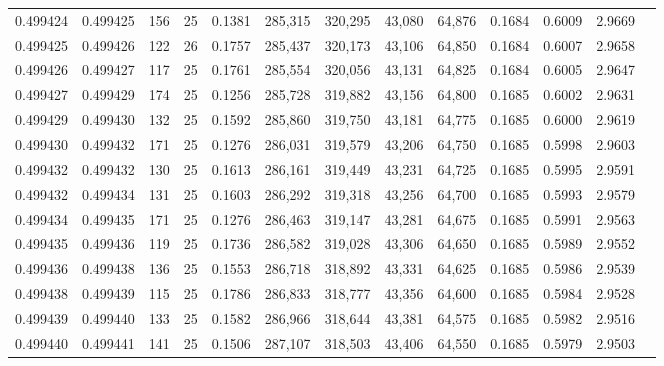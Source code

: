 \begin{tabular}{rrrrrrrrrrrrr}
0.499424 & 0.499425 & 156 &  25 &                                     0.1381 & 285,315 & 320,295 &  43,080 &  64,876 & 0.1684 & 0.6009 & 2.9669 \\
0.499425 & 0.499426 & 122 &  26 &                                     0.1757 & 285,437 & 320,173 &  43,106 &  64,850 & 0.1684 & 0.6007 & 2.9658 \\
0.499426 & 0.499427 & 117 &  25 &                                     0.1761 & 285,554 & 320,056 &  43,131 &  64,825 & 0.1684 & 0.6005 & 2.9647 \\
0.499427 & 0.499429 & 174 &  25 &                                     0.1256 & 285,728 & 319,882 &  43,156 &  64,800 & 0.1685 & 0.6002 & 2.9631 \\
0.499429 & 0.499430 & 132 &  25 &                                     0.1592 & 285,860 & 319,750 &  43,181 &  64,775 & 0.1685 & 0.6000 & 2.9619 \\
0.499430 & 0.499432 & 171 &  25 &                                     0.1276 & 286,031 & 319,579 &  43,206 &  64,750 & 0.1685 & 0.5998 & 2.9603 \\
0.499432 & 0.499432 & 130 &  25 &                                     0.1613 & 286,161 & 319,449 &  43,231 &  64,725 & 0.1685 & 0.5995 & 2.9591 \\
0.499432 & 0.499434 & 131 &  25 &                                     0.1603 & 286,292 & 319,318 &  43,256 &  64,700 & 0.1685 & 0.5993 & 2.9579 \\
0.499434 & 0.499435 & 171 &  25 &                                     0.1276 & 286,463 & 319,147 &  43,281 &  64,675 & 0.1685 & 0.5991 & 2.9563 \\
0.499435 & 0.499436 & 119 &  25 &                                     0.1736 & 286,582 & 319,028 &  43,306 &  64,650 & 0.1685 & 0.5989 & 2.9552 \\
0.499436 & 0.499438 & 136 &  25 &                                     0.1553 & 286,718 & 318,892 &  43,331 &  64,625 & 0.1685 & 0.5986 & 2.9539 \\
0.499438 & 0.499439 & 115 &  25 &                                     0.1786 & 286,833 & 318,777 &  43,356 &  64,600 & 0.1685 & 0.5984 & 2.9528 \\
0.499439 & 0.499440 & 133 &  25 &                                     0.1582 & 286,966 & 318,644 &  43,381 &  64,575 & 0.1685 & 0.5982 & 2.9516 \\
0.499440 & 0.499441 & 141 &  25 &                                     0.1506 & 287,107 & 318,503 &  43,406 &  64,550 & 0.1685 & 0.5979 & 2.9503 \\

\end{tabular}
